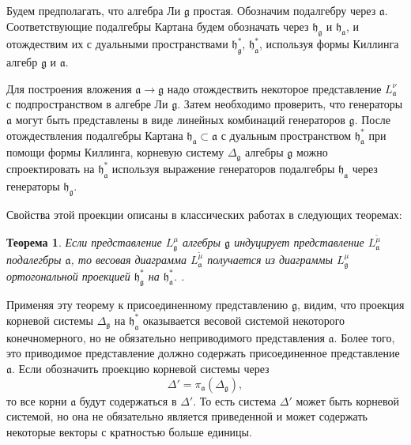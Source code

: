 \documentclass[12pt]{article}
\newtheorem{theorem}{Теорема}
\newcommand{\pia}{\pi_{\mathfrak{a}}}
\newcommand{\gf}{\mathfrak{g}}
\newcommand{\af}{\mathfrak{a}}
\newcommand{\hf}{\mathfrak{h}}
\newcommand{\hfg}{\hf_{\gf}}
\newcommand{\hfa}{\hf_{\af}}
\begin{document}
Будем предполагать, что алгебра Ли $\gf$ простая. Обозначим подалгебру через $\af$. Соответствующие
подалгебры Картана будем обозначать через $\hfg$ и $\hfa$, и отождествим их с дуальными
пространствами $\hfg^{*}$, $\hfa^{*}$, используя формы Киллинга алгебр  $\gf$ и $\af$.

Для построения вложения  $\af\to\gf$ надо отождествить некоторое представление  $L^{\nu}_{\af}$ с
подпространством в алгебре Ли $\gf$. Затем необходимо проверить, что генераторы  $\af$ могут быть
представлены в виде линейных комбинаций генераторов  $\gf$. После отождествления подалгебры Картана
$\hfa\subset \af$ с дуальным пространством $\hfa^{*}$ при помощи формы Киллинга, корневую систему
$\Delta_{\gf}$ алгебры $\gf$ можно спроектировать на  $\hfa^{*}$ используя выражение
генераторов подалгебры $\hfa$ через генераторы  $\hfg$.


Свойства этой проекции описаны в классических работах  \cite{dynkin1952semisimpleru,dynkin1952maximalru} в
следующих теоремах:

\begin{theorem}\label{dyn0}
  Если представление  $L^{\mu}_{\gf}$ алгебры $\gf$ индуцирует представление $L^{\tilde\mu}_{\af}$
  подалегбры $\af$, то весовая диаграмма $L^{\tilde\mu}_{\af}$ получается из диаграммы
  $L^{\mu}_{\gf}$ ортогональной проекцией $\hfg^{*}$ на $\hfa^{*}$.
  \cite{dynkin1952maximalru}. 
\end{theorem} 

Применяя эту теорему к присоединенному представлению  $\gf$, видим, что проекция корневой
системы  $\Delta_{\gf}$ на $\hfa^{*}$ оказывается весовой системой некоторого конечномерного, но не
обязательно неприводимого представления $\af$. Более того, это приводимое представление должно
содержать присоединенное представление $\af$. Если обозначить проекцию корневой системы через
\begin{equation}
  \label{eq:2}
  \Delta'=\pia\left(\Delta_{\gf}\right),
\end{equation}
то все корни $\af$ будут содержаться в $\Delta'$. То есть система  $\Delta'$ может быть корневой
системой, но она не обязательно является приведенной и может содержать некоторые векторы с
кратностью больше единицы.
\end{document}
